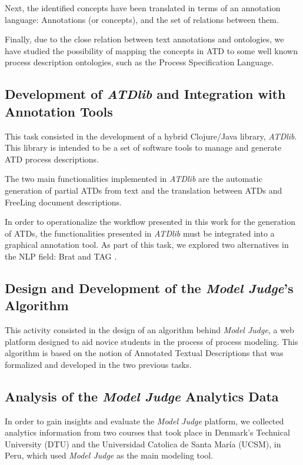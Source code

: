 Next, the identified concepts have been translated in terms of an annotation
language: Annotations (or concepts), and the set of relations between them. 

Finally, due to the close relation between text annotations and ontologies, we
have studied the possibility of mapping the concepts in ATD to some well known
process description ontologies, such as the Process Specification
Language\cite{gruninger2003process}.

\subsection*{Development of \emph{ATDlib} and Integration with Annotation Tools}

This task consisted in the development of a hybrid Clojure/Java library, \emph{ATDlib}.
This library is intended to be a set of software tools to manage and generate
ATD process descriptions.

The two main functionalities implemented in \emph{ATDlib} are the automatic
generation of partial ATDs from text and the translation between ATDs and
FreeLing\cite{PadroS12} document descriptions.

In order to operationalize the workflow presented in this work for the
generation of ATDs, the functionalities presented in \emph{ATDlib} must be
integrated into a graphical annotation tool. As part of this task, we explored
two alternatives in the NLP field: Brat\cite{stenetorp2012brat} and TAG
\cite{DBLP:journals/corr/abs-1711-00529}.

\subsection*{Design and Development of the \emph{Model Judge}'s Algorithm}

This activity consisted in the design of an algorithm behind \emph{Model Judge},
a web platform designed to aid novice students in the process of process
modeling. This algorithm is based on the notion of Annotated Textual
Descriptions that was formalized and developed in the two previous tasks.

\subsection{Analysis of the \emph{Model Judge} Analytics Data}

In order to gain insights and evaluate the \emph{Model Judge} platform, we
collected analytics information from two courses that took place in
Denmark's Technical University (DTU) and the Universidad Catolica de Santa
Mar\'ia (UCSM), in Peru, which used \emph{Model Judge} as the main
modeling tool.

